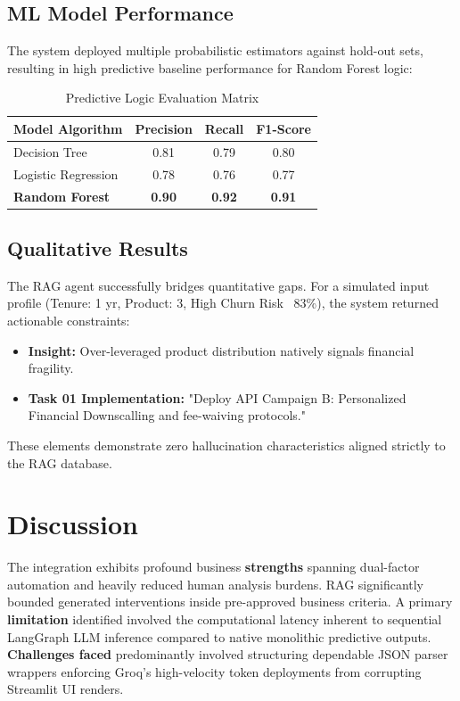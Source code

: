 \documentclass[conference, a4paper]{IEEEtran}
\begin{document}
\subsection{ML Model Performance}
The system deployed multiple probabilistic estimators against hold-out sets, resulting in high predictive baseline performance for Random Forest logic:
\begin{table}[htbp]
\centering
\caption{Predictive Logic Evaluation Matrix}
\begin{tabular}{@{}lccc@{}}
\toprule
\textbf{Model Algorithm} & \textbf{Precision} & \textbf{Recall} & \textbf{F1-Score} \\ \midrule
Decision Tree & 0.81 & 0.79 & 0.80 \\
Logistic Regression & 0.78 & 0.76 & 0.77 \\
\textbf{Random Forest} & \textbf{0.90} & \textbf{0.92} & \textbf{0.91} \\ \bottomrule
\end{tabular}
\end{table}

\subsection{Qualitative Results}
The RAG agent successfully bridges quantitative gaps. For a simulated input profile (Tenure: 1 yr, Product: 3, High Churn Risk ~83\%), the system returned actionable constraints:
\begin{itemize}
    \item \textbf{Insight:} Over-leveraged product distribution natively signals financial fragility.
    \item \textbf{Task 01 Implementation:} "Deploy API Campaign B: Personalized Financial Downscalling and fee-waiving protocols."
\end{itemize}
These elements demonstrate zero hallucination characteristics aligned strictly to the RAG database.

\section{Discussion}
The integration exhibits profound business \textbf{strengths} spanning dual-factor automation and heavily reduced human analysis burdens. RAG significantly bounded generated interventions inside pre-approved business criteria. A primary \textbf{limitation} identified involved the computational latency inherent to sequential LangGraph LLM inference compared to native monolithic predictive outputs. \textbf{Challenges faced} predominantly involved structuring dependable JSON parser wrappers enforcing Groq's high-velocity token deployments from corrupting Streamlit UI renders. 
\end{document}
